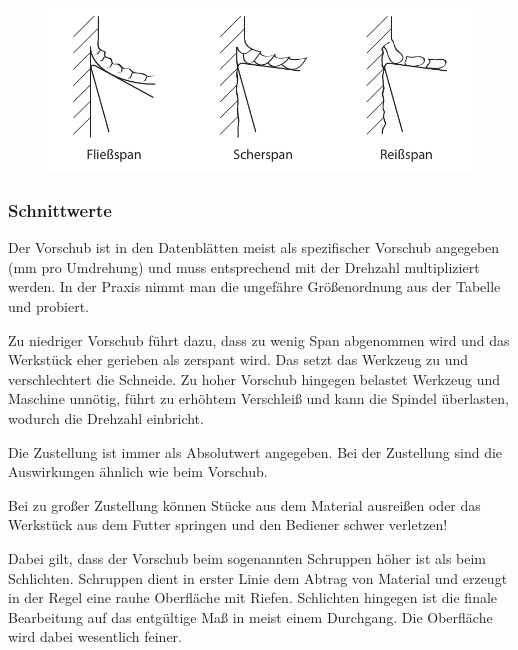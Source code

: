 \documentclass{\basedir/fablab-document}
\begin{document}
\begin{figure}[ht]
\centering
\includegraphics[width = \linewidth]{img/spanformen}
\end{figure}

\subsubsection{Schnittwerte}
\label{Schnittwerte}
Der Vorschub ist in den Datenblätten meist als spezifischer Vorschub angegeben (mm pro Umdrehung) und muss entsprechend mit der Drehzahl multipliziert werden. In der Praxis nimmt man die ungefähre Größenordnung aus der Tabelle und probiert.

Zu niedriger Vorschub führt dazu, dass zu wenig Span abgenommen wird und das Werkstück eher gerieben als zerspant wird. Das setzt das Werkzeug zu und verschlechtert die Schneide. Zu hoher Vorschub hingegen belastet Werkzeug und Maschine unnötig, führt zu erhöhtem Verschleiß und kann die Spindel überlasten, wodurch die Drehzahl einbricht.

Die Zustellung ist immer als Absolutwert angegeben. Bei der Zustellung sind die Auswirkungen ähnlich wie beim Vorschub.

Bei zu großer Zustellung können Stücke aus dem Material ausreißen oder das Werkstück aus dem Futter springen und den Bediener schwer verletzen!

Dabei gilt, dass der Vorschub beim sogenannten Schruppen höher ist als beim Schlichten. Schruppen dient in erster Linie dem Abtrag von Material und erzeugt in der Regel eine rauhe Oberfläche mit Riefen. Schlichten hingegen ist die finale Bearbeitung auf das entgültige Maß in meist einem Durchgang. Die Oberfläche wird dabei wesentlich feiner. 

\setlength{\tabcolsep}{0.5em}
\end{document}
